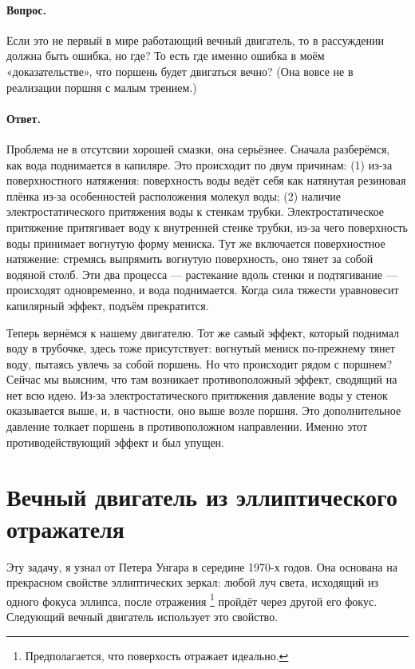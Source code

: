 \paragraph{Вопрос.}
Если это не первый в мире работающий вечный двигатель, то в рассуждении должна быть ошибка, но где?
То есть где именно ошибка в моём «доказательстве», что поршень будет двигаться вечно?
(Она вовсе не в реализации поршня с малым трением.)

\paragraph{Ответ.}
Проблема не в отсутсвии хорошей смазки, она серьёзнее.
Сначала разберёмся, как вода поднимается в капиляре.
Это происходит по двум причинам:
(1) из-за поверхностного натяжения: поверхность воды ведёт себя как натянутая резиновая плёнка из-за особенностей расположения молекул воды;
(2) наличие электростатического притяжения воды к стенкам трубки.
Электростатическое притяжение притягивает воду к внутренней стенке трубки, из-за чего поверхность воды принимает вогнутую форму мениска.
Тут же включается поверхностное натяжение: стремясь выпрямить вогнутую поверхность, оно тянет за собой водяной столб.
Эти два процесса — растекание вдоль стенки и подтягивание — происходят одновременно, и вода поднимается.
Когда сила тяжести уравновесит капилярный эффект, подъём прекратится.

Теперь вернёмся к нашему двигателю.
Тот же самый эффект, который поднимал воду в трубочке, здесь тоже присутствует: вогнутый мениск по-прежнему тянет воду, пытаясь увлечь за собой поршень.
Но что происходит рядом с поршнем?
Сейчас мы выясним, что там возникает противоположный эффект, сводящий на нет всю идею.
Из-за электростатического притяжения давление воды у стенок оказывается выше, и, в частности, оно выше возле поршня.
Это дополнительное давление толкает поршень в противоположном направлении.
Именно этот противодействующий эффект и был упущен.

\section{Вечный двигатель из эллиптического отражателя}

Эту задачу, я узнал от Петера Унгара в середине
1970-х годов.
Она основана на прекрасном свойстве эллиптических зеркал:
любой луч света, исходящий из одного фокуса эллипса,
после отражения%
\footnote{Предполагается, что поверхость отражает идеально.}
пройдёт через другой его фокус.
Следующий вечный двигатель использует это свойство.

